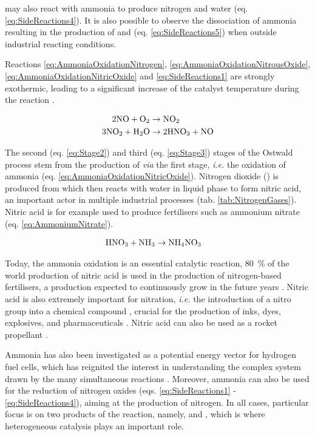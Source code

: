 may also react with ammonia to produce nitrogen and water (eq. \ref{eq:SideReactions4}).
It is also possible to observe the dissociation of ammonia resulting in the production of  and  (eq. \ref{eq:SideReactions5}) when outside industrial reacting conditions.

Reactions \ref{eq:AmmoniaOxidationNitrogen}, \ref{eq:AmmoniaOxidationNitrousOxide}, \ref{eq:AmmoniaOxidationNitricOxide} and \ref{eq:SideReactions1} are strongly exothermic, leading to a significant increase of the catalyst temperature during the reaction \parencite{Hatscher2008}.

\begin{align}
    \label{eq:Stage2}
    2 \nitricoxide + \ce{O_2} & \rightarrow \nitrogendioxide \\
    \label{eq:Stage3}
    3 \nitrogendioxide + \water & \rightarrow 2\nitricacid + \nitricoxide
\end{align}

The second (eq. \ref{eq:Stage2}) and third (eq. \ref{eq:Stage3}) stages of the Ostwald process stem from the production of  \textit{via} the first stage, \textit{i.e.} the oxidation of ammonia (eq. \ref{eq:AmmoniaOxidationNitricOxide}).
Nitrogen dioxide (\nitrogendioxide) is produced from  which then reacts with water in liquid phase to form nitric acid, an important actor in multiple industrial processes (tab. \ref{tab:NitrogenGases}).
Nitric acid is for example used to produce fertilisers such as ammonium nitrate (eq. \ref{eq:AmmoniumNitrate}).

\begin{align}
    \label{eq:AmmoniumNitrate}
    \nitricacid + \ammonia & \rightarrow \ammoniumnitrate
\end{align}

Today, the ammonia oxidation is an essential catalytic reaction, \qty{80}{\percent} of the world production of nitric acid is used in the production of nitrogen-based fertilisers, a production expected to continuously grow in the future years \parencite{Lim2021a}.
Nitric acid is also extremely important for nitration, \textit{i.e.} the introduction of a nitro group into a chemical compound \parencite{Hughes1950}, crucial for the production of inks, dyes, explosives, and pharmaceuticals \parencite{Lee2005, Ouellette2014}.
Nitric acid can also be used as a rocket propellant \parencite{Mason1956, Oommen1999}.

Ammonia has also been investigated as a potential energy vector for hydrogen fuel cells, which has reignited the interest in understanding the complex system drawn by the many simultaneous reactions \parencite{Afif2016, Georgina2021}.
Moreover, ammonia can also be used for the reduction of nitrogen oxides (eqs. \ref{eq:SideReactions1} - \ref{eq:SideReactions4}), aiming at the production of nitrogen.
In all cases, particular focus is on two products of the reaction, namely,  and , which is where heterogeneous catalysis plays an important role.

